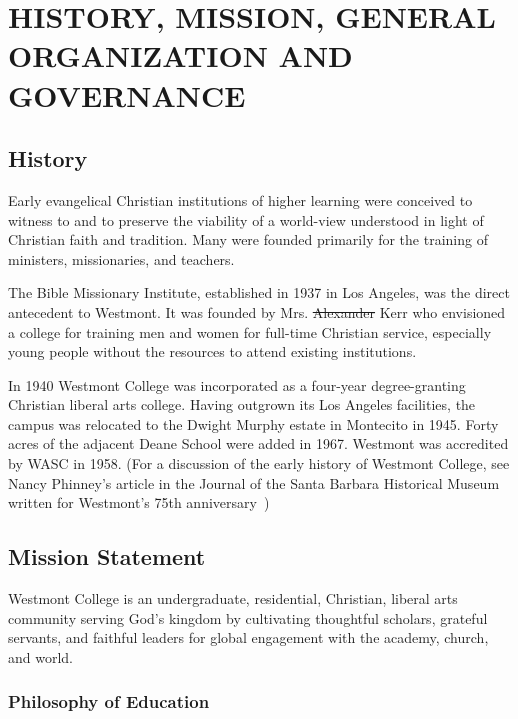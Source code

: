 \section{HISTORY, MISSION, GENERAL ORGANIZATION
		AND GOVERNANCE}
	\label{sec:HMGOG}
	\subsection{History}
		Early evangelical Christian institutions of higher learning were conceived to
		witness to and to preserve the viability of a world-view understood in light of
		Christian faith and tradition. Many were founded primarily for the training of
		ministers, missionaries, and teachers.

		The Bible Missionary Institute, established in 1937 in Los Angeles, was the
		direct antecedent to Westmont. It was founded by Mrs. \st{Alexander}  Kerr who
		envisioned a college for training men and women for full-time Christian service,
		especially young people without the resources to attend existing institutions.

		In 1940 Westmont College was incorporated as a four-year degree-granting
		Christian liberal arts college. Having outgrown its Los Angeles facilities, the
		campus was relocated to the Dwight Murphy estate in Montecito in 1945.  Forty
		acres of the adjacent Deane School were added in 1967. Westmont was accredited
		by WASC in 1958. (For a discussion of the early history of Westmont College, see
		Nancy Phinney's article in the
		Journal of the Santa Barbara Historical Museum
		written for Westmont's 75th anniversary~\cite{Phinney2012})

	\subsection{Mission Statement}

		Westmont College is an undergraduate, residential, Christian, liberal arts
		community serving God's kingdom by cultivating thoughtful scholars, grateful
		servants, and faithful leaders for global engagement with the academy, church,
		and world.

		\subsubsection{Philosophy of Education}

